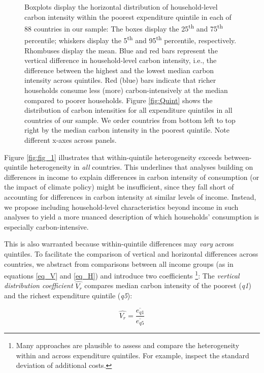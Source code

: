 \documentclass[12pt, a4paper]{article}
\newenvironment{subcaption2}
{\strut
\vspace{-5pt}
\begin{minipage}[b]{0.95\textwidth}
  \hspace*{-\parindent}
  \footnotesize}
 {\end{minipage}}
\begin{document}
\begin{figure}[ht!]
\begin{subcaption2}
    Boxplots display the horizontal distribution of household-level carbon intensity within the poorest expenditure quintile in each of 88 countries in our sample: The boxes display the 25\textsuperscript{th} and 75\textsuperscript{th} percentile; whiskers display the 5\textsuperscript{th} and 95\textsuperscript{th} percentile, respectively. Rhombuses display the mean. Blue and red bars represent the vertical difference in household-level carbon intensity, i.e., the difference between the highest and the lowest median carbon intensity across quintiles. Red (blue) bars indicate that richer households consume less (more) carbon-intensively at the median compared to poorer households. Figure \ref{fig:Quint} shows the distribution of carbon intensities for all expenditure quintiles in all countries of our sample. We order countries from bottom left to top right by the median carbon intensity in the poorest quintile. Note different x-axes across panels.
    \end{subcaption2}
\end{figure}

Figure \ref{fig:fig_1} illustrates that within-quintile heterogeneity exceeds between-quintile heterogeneity in \textit{all} countries. This underlines that analyses building on differences in income to explain differences in carbon intensity of consumption (or the impact of climate policy) might be insufficient, since they fall short of accounting for differences in carbon intensity at similar levels of income. Instead, we propose including household-level characteristics beyond income in such analyses to yield a more nuanced description of which households' consumption is especially carbon-intensive.

This is also warranted because within-quintile differences may \textit{vary} across quintiles. To facilitate the comparison of vertical and horizontal differences across countries, we abstract from comparisons between all income groups (as in equations \ref{eq_V} and \ref{eq_H}) and introduce two coefficients \autocite{Missbach.2024}\footnote{Many approaches are plausible to assess and compare the heterogeneity within and across expenditure quintiles. For example, \textcite{Cronin.2019} inspect the standard deviation of additional costs.}: The \textit{vertical distribution coefficient} $\widehat{V_{r}}$ compares median carbon intensity of the poorest (\textit{q1}) and the richest expenditure quintile (\textit{q5}):

\begin{equation}
    \widehat{V_{r}} = \frac{\overline{e_{q1}}}{\overline{e_{q5}}}
\end{equation}
\end{document}
